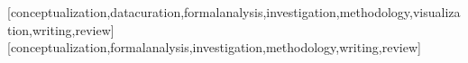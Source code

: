 \documentclass[portuguese]{textolivre}
\begin{document}
\printbibliography\label{sec-bib}


\begin{contributors}
[conceptualization,datacuration,formalanalysis,investigation,methodology,visualization,writing,review]
[conceptualization,formalanalysis,investigation,methodology,writing,review]
\end{contributors}
\end{document}
